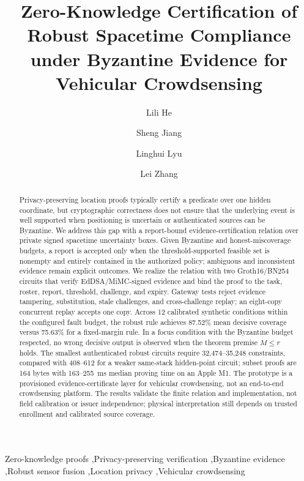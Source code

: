 \documentclass[preprint,review,12pt]{elsarticle}
\begin{document}
\begin{frontmatter}
\title{Zero-Knowledge Certification of Robust Spacetime Compliance under Byzantine Evidence for Vehicular Crowdsensing}
\author[aff1]{Lili He}
\author[aff1]{Sheng Jiang}
\author[aff1]{Linghui Lyu}
\author[aff1]{Lei Zhang}
\begin{abstract}
Privacy-preserving location proofs typically certify a predicate over one hidden coordinate, but cryptographic correctness does not ensure that the underlying event is well supported when positioning is uncertain or authenticated sources can be Byzantine. We address this gap with a report-bound evidence-certification relation over private signed spacetime uncertainty boxes. Given Byzantine and honest-miscoverage budgets, a report is accepted only when the threshold-supported feasible set is nonempty and entirely contained in the authorized policy; ambiguous and inconsistent evidence remain explicit outcomes. We realize the relation with two Groth16/BN254 circuits that verify EdDSA/MiMC-signed evidence and bind the proof to the task, roster, report, threshold, challenge, and expiry. Gateway tests reject evidence tampering, substitution, stale challenges, and cross-challenge replay; an eight-copy concurrent replay accepts one copy. Across 12 calibrated synthetic conditions within the configured fault budget, the robust rule achieves 87.52\% mean decisive coverage versus 75.63\% for a fixed-margin rule. In a focus condition with the Byzantine budget respected, no wrong decisive output is observed when the theorem premise $M\le r$ holds. The smallest authenticated robust circuits require 32,474--35,248 constraints, compared with 408--612 for a weaker same-stack hidden-point circuit; subset proofs are 164 bytes with 163--255~ms median proving time on an Apple M1. The prototype is a provisioned evidence-certificate layer for vehicular crowdsensing, not an end-to-end crowdsensing platform. The results validate the finite relation and implementation, not field calibration or issuer independence; physical interpretation still depends on trusted enrollment and calibrated source coverage.
\end{abstract}
\begin{keyword}
Zero-knowledge proofs \sep Privacy-preserving verification \sep Byzantine evidence \sep Robust sensor fusion \sep Location privacy \sep Vehicular crowdsensing
\end{keyword}
\end{frontmatter}
\linenumbers
\end{document}
